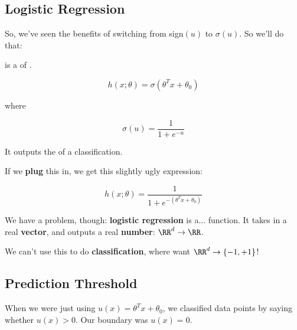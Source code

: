     \subsection{Logistic Regression}
    
        So, we've seen the benefits of switching from sign$(u)$ to $\sigma(u)$. So we'll do that:
            \\
        
        
        \begin{kequation}
             is a  of .
            
            \begin{equation*}
                h(x; \theta) = \sigma(\theta^T x + \theta_0 )
            \end{equation*}
        
            \centerline{where}
            
            \begin{equation*}
                \sigma(u) = \frac{1}{1+e^{-u}}
            \end{equation*}
            
            It outputs the  of a  classification.
        \end{kequation}
        
        If we \textbf{plug} this in, we get this slightly ugly expression:
        
        \begin{equation*}
            h(x; \theta) = \frac{1}{1+e^{-(\theta^T x + \theta_0) } }
        \end{equation*}
        
        We have a problem, though: \textbf{logistic regression} is a...  function. It takes in a real \textbf{vector}, and outputs a real \textbf{number}: $\RR^d \rightarrow \RR$.
        
        We can't use this to do \textbf{classification}, where want $\RR^d \rightarrow \{-1,+1\}$!
        
    \subsection{Prediction Threshold}
    
        When we were just using $u(x) = \theta^T x + \theta_0$, we classified data points by saying whether $u(x)>0$. Our boundary was $u(x)=0$.
        
